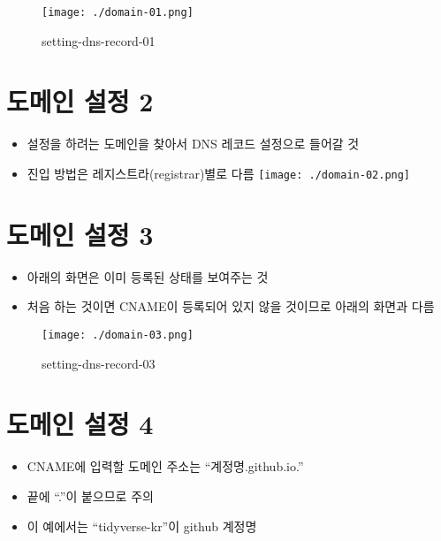 \documentclass[
]{article}
\providecommand{\tightlist}{%
  \setlength{\itemsep}{0pt}\setlength{\parskip}{0pt}}
\begin{document}
\begin{figure}
\centering
\texttt{[image: ./domain-01.png]}
\caption{setting-dns-record-01}
\end{figure}

\hypertarget{uxb3c4uxba54uxc778-uxc124uxc815-2}{%
\section{도메인 설정 2}\label{uxb3c4uxba54uxc778-uxc124uxc815-2}}

\begin{itemize}
\tightlist
\item
  설정을 하려는 도메인을 찾아서 DNS 레코드 설정으로 들어갈 것
\item
  진입 방법은 레지스트라(registrar)별로 다름
  \texttt{[image: ./domain-02.png]}
\end{itemize}

\hypertarget{uxb3c4uxba54uxc778-uxc124uxc815-3}{%
\section{도메인 설정 3}\label{uxb3c4uxba54uxc778-uxc124uxc815-3}}

\begin{itemize}
\tightlist
\item
  아래의 화면은 이미 등록된 상태를 보여주는 것
\item
  처음 하는 것이면 CNAME이 등록되어 있지 않을 것이므로 아래의 화면과
  다름
\end{itemize}

\begin{figure}
\centering
\texttt{[image: ./domain-03.png]}
\caption{setting-dns-record-03}
\end{figure}

\hypertarget{uxb3c4uxba54uxc778-uxc124uxc815-4}{%
\section{도메인 설정 4}\label{uxb3c4uxba54uxc778-uxc124uxc815-4}}

\begin{itemize}
\tightlist
\item
  CNAME에 입력할 도메인 주소는 ``계정명.github.io.''
\item
  끝에 ``.''이 붙으므로 주의
\item
  이 예에서는 ``tidyverse-kr''이 github 계정명
\end{itemize}
\end{document}
